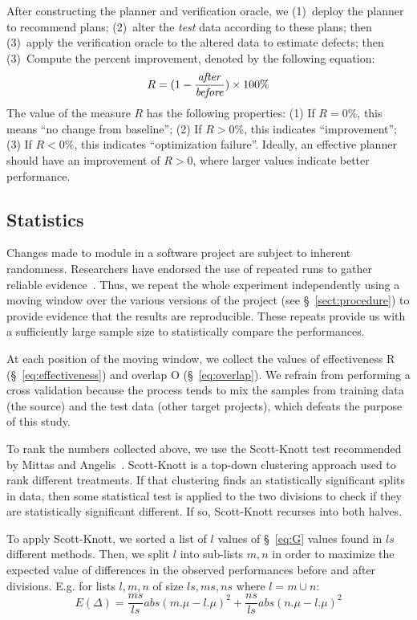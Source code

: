 \documentclass[sigconf, proceedings, 9pt]{acmart}
\newcommand{\tion}[1]{\S~\ref{sect:#1}}
\newcommand{\eq}[1]{\S~\ref{eq:#1}}
\begin{document}
After constructing the planner and verification oracle, we (1)~deploy the 
{planner} to recommend plans; (2)~alter the {\em test} data according to these 
plans;
then (3)~apply the {verification oracle} to the altered data to estimate 
defects; then (3)~Compute the percent improvement, denoted by the following 
equation:
\begin{equation}
\small
\label{eq:effectiveness}
R=(1-\frac{\mathit{after}}{\mathit{before}})\times100\%
\end{equation}
The value of the measure $R$ has the following properties: (1) If $R = 0\%$, 
this means  ``no change from baseline''; 
(2) If $R > 0\%$, this indicates ``improvement'';
(3) If $R < 0\%$, this indicates ``optimization failure''. Ideally, an 
effective planner should have an improvement of $R>0$, where larger values 
indicate better performance. 

\subsection{Statistics}
\label{sect:stats}
Changes made to module in a software project are subject to inherent 
randomness. Researchers have endorsed the use of repeated runs 
to gather reliable evidence~\cite{vaux2012replicates}. Thus, we repeat the 
whole experiment independently using a moving window over 
the various versions  of the project (see \tion{procedure}) to provide evidence 
that the results are reproducible. These repeats provide us with a sufficiently 
large sample size to statistically compare the performances. 

At each position of the moving window, we collect the values of effectiveness R 
(\eq{effectiveness})
and overlap O (\eq{overlap}). We refrain from 
performing a cross validation because the process tends to mix the samples 
from training data (the source) and the test data (other target 
projects), which defeats the purpose of this study.

To rank the numbers collected above, we use the Scott-Knott test 
recommended by Mittas and Angelis~\cite{mittas13}. Scott-Knott is a 
top-down clustering approach used to rank different treatments. If that 
clustering finds an statistically significant splits in data, then some 
statistical test is applied to the two divisions to check if they are 
statistically significant different. If so, Scott-Knott recurses into both 
halves.

To  apply Scott-Knott, we sorted a list of  $l$ values of \eq{G} 
values found in $ls$ different methods. Then, we split $l$ into 
sub-lists $m,n$ in order to maximize the expected value of differences in 
the observed performances before and after divisions. E.g. for lists 
$l,m,n$ of size $ls,ms,ns$ where $l=m\cup n$: 
\[E(\Delta)=\frac{ms}{ls}abs(m.\mu - l.\mu)^2 + \frac{ns}{ls}abs(n.\mu - 
l.\mu)^2\] 
\end{document}
